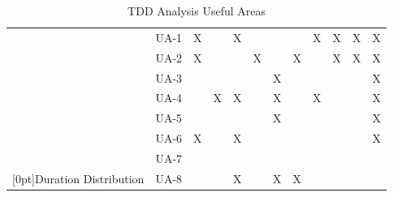 \begin{table}[!htbp]
\begin{tabular}{|l|l|l|l|l|l|l|l|l|l|l|l|}
    &  UA-1 &  X  &     &  X  &     &     &     &  X  &  X  &  X  &  X  \\ \cline{2-12} 
    &  UA-2 &  X  &     &     &  X  &     &  X  &     &  X  &  X  &  X  \\ \cline{2-12} 
    &  UA-3 &     &     &     &     &  X  &     &     &     &     &  X  \\ \cline{2-12}  
    &  UA-4 &     &  X  &  X  &     &  X  &     &  X  &     &     &  X  \\ \cline{2-12} 
    &  UA-5 &     &     &     &     &  X  &     &     &     &     &  X  \\ \cline{2-12}  
    &  UA-6 &  X  &     &  X  &     &     &     &     &     &     &  X  \\ \cline{2-12} 
    &  UA-7 &     &     &     &     &     &     &     &     &     &     \\ \cline{2-12}  
\raisebox{10ex}[0pt]{Duration  Distribution}  
    &  UA-8 &     &     &  X  &     &  X  &  X  &     &     &     &     \\ \hline
    \end{tabular}
  \caption{TDD Analysis Useful Areas}\label{tab:UsefulnessArea}  
\end{table}

